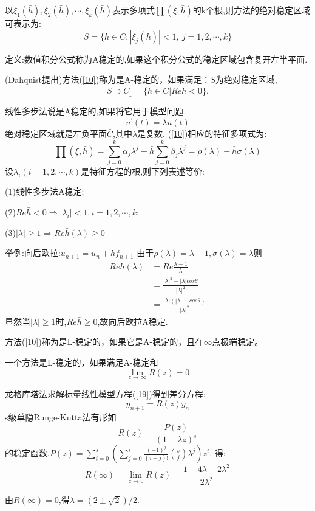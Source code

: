 \documentclass{article}
\begin{document}
\begin{CJK}{UTF8}{gkai}
以$\xi_{1}(\bar{h}),\xi_{2}(\bar{h}),\cdots,\xi_{k}(\bar{h})$表示多项式$\prod(\xi,\bar{h})$的k个根,则方法的绝对稳定区域可表示为:
\begin{equation}
S=\{ \bar{h}\in\bar{C}:|\xi_{j}(\bar{h})|<1,~j=1,2,\cdots,k \}
\end{equation}

定义:数值积分公式称为A稳定的,如果这个积分公式的稳定区域包含复开左半平面.

(Dahquist提出)方法(\ref{10})称为是A-稳定的，如果满足：$S$为绝对稳定区域,
\begin{equation*}
S\supset C_{\_}=\{\bar{h}\in C|Re\bar{h}<0\}.
\end{equation*}

线性多步法说是A稳定的,如果将它用于模型问题:
\begin{equation}
u^{'}(t)=\lambda u(t)
\label{19}
\end{equation}
绝对稳定区域就是左负平面$\bar{C}$,其中$\lambda$是复数.
(\ref{10})相应的特征多项式为:
\begin{equation}
\prod(\xi,\bar{h})=\sum_{j=0}^{k}\alpha_{j}\lambda^{j}-\bar{h}\sum_{j=0}^{k}\beta_{j}\lambda^{j}=\rho(\lambda)-\bar{h}\sigma(\lambda)
\end{equation}
设$\lambda_{i}(i=1,2,\cdots,k)$是特征方程的根,则下列表述等价:

(1)线性多步法A稳定;

(2)$Re\bar{h}<0\Rightarrow|\lambda_{i}|<1,i=1,2,\cdots,k;$

(3)$|\lambda|\ge 1\Rightarrow Re\bar{h}(\lambda)\ge 0$

举例:向后欧拉:$u_{n+1}=u_{n}+hf_{n+1}$
由于$\rho(\lambda)=\lambda-1,\sigma(\lambda)=\lambda$则
\begin{align}
Re\bar{h}(\lambda)&=Re\frac{\lambda-1}{\lambda}\\&=\frac{|\lambda|^2-|\lambda|cos\theta}{|\lambda|^2}\\&=\frac{|\lambda|(|\lambda|-cos\theta)}{|\lambda|^2}
\end{align}
显然当$|\lambda|\ge 1$时,$Re\bar{h}\ge 0$,故向后欧拉A稳定.

方法(\ref{10})称为是L-稳定的，如果它是A-稳定的，且在$\infty$点极端稳定。

一个方法是L-稳定的，如果满足A-稳定和
\begin{equation*}
\lim\limits_{z\to\infty}R(z)=0
\end{equation*}

龙格库塔法求解标量线性模型方程(\ref{19})得到差分方程:
\begin{equation}
y_{n+1}=R(z)y_{n}
\end{equation}
s级单隐Runge-Kutta法有形如
\begin{equation}
R(z)=\frac{P(z)}{(1-\lambda z)^s}
\end{equation}
的稳定函数.$P(z)=\sum_{i=0}^{s}(\sum_{j=0}^{i}\frac{(-1)^j}{(i-j)!}\binom{s}{j}\lambda^j)z^i$.
得:
\begin{equation}
R(\infty)=\lim\limits_{z\to 0}R(z)=\frac{1-4\lambda+2\lambda^2}{2\lambda^2}
\end{equation}

由$R(\infty)=0$,得$\lambda=(2\pm\sqrt{2})/2$.

\end{CJK}
\end{document}
